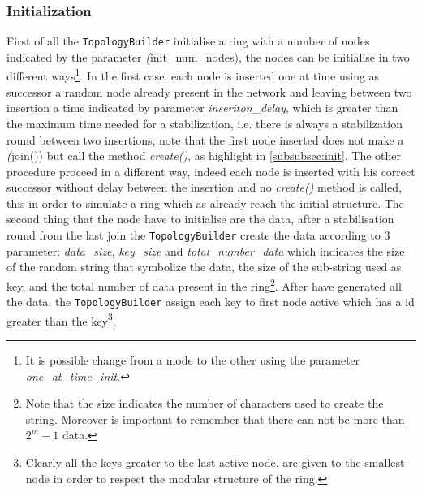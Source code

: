 \documentclass[11pt,twocolumn,letterpaper]{article}
\begin{document}
	\subsubsection{Initialization}
	First of all the \texttt{TopologyBuilder} initialise a ring with a number of nodes indicated by the parameter \textit(init\_num\_nodes), the nodes can be initialise in two different ways\footnote{It is possible change from a mode to the other using the parameter \textit{one\_at\_time\_init}.}. In the first case, each node is inserted one at time using as successor a random node already present in the network and leaving between two insertion a time indicated by parameter \textit{inseriton\_delay}, which is greater than the maximum time needed for a stabilization, i.e. there is always a stabilization round between two insertions, note that the first node inserted does not make a \textit(join()) but call the method \textit{create()}, as highlight in \cref{subsubsec:init}. The other procedure proceed in a different way, indeed each node is inserted with his correct successor without delay between the insertion and no \textit{create()} method is called, this in order to simulate a ring which as already reach the initial structure.
	The second thing that the node have to initialise are the data, after a stabilisation round from the last join the \texttt{TopologyBuilder} create the data according to 3 parameter: \textit{data\_size}, \textit{key\_size} and \textit{total\_number\_data} which indicates the size of the random string that symbolize the data, the size of the sub-string used as key, and the total number of data present in the ring\footnote{Note that the size indicates the number of characters used to create the string. Moreover is important to remember that there can not be more than $2^m -1$ data.}. After have generated all the data, the \texttt{TopologyBuilder} assign each key to first node active which has a id greater than the key\footnote{Clearly all the keys greater to the last active node, are given to the smallest node in order to respect the modular structure of the ring.}.
\end{document}
